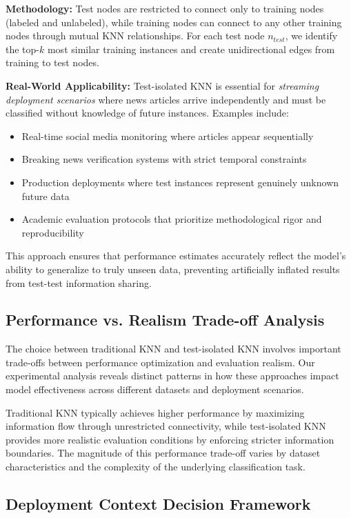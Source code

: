 \textbf{Methodology:} Test nodes are restricted to connect only to training nodes (labeled and unlabeled), while training nodes can connect to any other training nodes through mutual KNN relationships. For each test node $n_{test}$, we identify the top-$k$ most similar training instances and create unidirectional edges from training to test nodes.

\textbf{Real-World Applicability:} Test-isolated KNN is essential for \emph{streaming deployment scenarios} where news articles arrive independently and must be classified without knowledge of future instances. Examples include:
\begin{itemize}
    \item Real-time social media monitoring where articles appear sequentially
    \item Breaking news verification systems with strict temporal constraints
    \item Production deployments where test instances represent genuinely unknown future data
    \item Academic evaluation protocols that prioritize methodological rigor and reproducibility
\end{itemize}

This approach ensures that performance estimates accurately reflect the model's ability to generalize to truly unseen data, preventing artificially inflated results from test-test information sharing.

\subsection{Performance vs. Realism Trade-off Analysis}

The choice between traditional KNN and test-isolated KNN involves important trade-offs between performance optimization and evaluation realism. Our experimental analysis reveals distinct patterns in how these approaches impact model effectiveness across different datasets and deployment scenarios.

Traditional KNN typically achieves higher performance by maximizing information flow through unrestricted connectivity, while test-isolated KNN provides more realistic evaluation conditions by enforcing stricter information boundaries. The magnitude of this performance trade-off varies by dataset characteristics and the complexity of the underlying classification task.

\subsection{Deployment Context Decision Framework}

